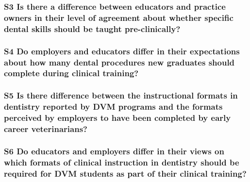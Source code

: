 \documentclass[
  11pt,
  letterpaper,
  DIV=11,
  numbers=noendperiod]{scrartcl}
\begin{document}
\hypertarget{s3-is-there-a-difference-between-educators-and-practice-owners-in-their-level-of-agreement-about-whether-specific-dental-skills-should-be-taught-pre-clinically}{%
\subsubsection{S3 Is there a difference between educators and practice
owners in their level of agreement about whether specific dental skills
should be taught
pre-clinically?}\label{s3-is-there-a-difference-between-educators-and-practice-owners-in-their-level-of-agreement-about-whether-specific-dental-skills-should-be-taught-pre-clinically}}

\hypertarget{s4-do-employers-and-educators-differ-in-their-expectations-about-how-many-dental-procedures-new-graduates-should-complete-during-clinical-training}{%
\subsubsection{S4 Do employers and educators differ in their
expectations about how many dental procedures new graduates should
complete during clinical
training?}\label{s4-do-employers-and-educators-differ-in-their-expectations-about-how-many-dental-procedures-new-graduates-should-complete-during-clinical-training}}

\hypertarget{s5-is-there-difference-between-the-instructional-formats-in-dentistry-reported-by-dvm-programs-and-the-formats-perceived-by-employers-to-have-been-completed-by-early-career-veterinarians}{%
\subsubsection{S5 Is there difference between the instructional formats
in dentistry reported by DVM programs and the formats perceived by
employers to have been completed by early career
veterinarians?}\label{s5-is-there-difference-between-the-instructional-formats-in-dentistry-reported-by-dvm-programs-and-the-formats-perceived-by-employers-to-have-been-completed-by-early-career-veterinarians}}

\hypertarget{s6-do-educators-and-employers-differ-in-their-views-on-which-formats-of-clinical-instruction-in-dentistry-should-be-required-for-dvm-students-as-part-of-their-clinical-training}{%
\subsubsection{S6 Do educators and employers differ in their views on
which formats of clinical instruction in dentistry should be required
for DVM students as part of their clinical
training?}\label{s6-do-educators-and-employers-differ-in-their-views-on-which-formats-of-clinical-instruction-in-dentistry-should-be-required-for-dvm-students-as-part-of-their-clinical-training}}
\end{document}
